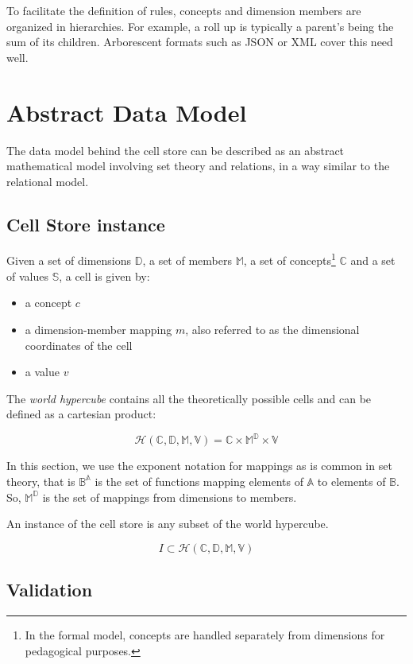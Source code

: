 \documentclass{acm_proc_article-sp}
\begin{document}
To facilitate the definition of rules, concepts and dimension members are organized in hierarchies. For example, a roll up is typically a parent's being the sum of its children. Arborescent formats such as JSON or XML cover this need well.

\section{Abstract Data Model}
\label{section-abstract-data-model}
The data model behind the cell store can be described as an abstract mathematical model involving set theory and relations, in a way similar to the relational model.
\subsection{Cell Store instance}

Given a set of dimensions $\mathbb{D}$, a set of members $\mathbb{M}$, a set of concepts\footnote{In the formal model, concepts are handled separately from dimensions for pedagogical purposes.} $\mathbb{C}$ and a set of values $\mathbb{S}$, a cell is given by:

\begin{itemize}
\item a concept $c$
\item a dimension-member mapping $m$, also referred to as the dimensional coordinates of the cell
\item a value $v$
\end{itemize}

The \emph{world hypercube} contains all the theoretically possible cells and can be defined as a cartesian product:

$$\mathcal{H}(\mathbb{C}, \mathbb{D}, \mathbb{M}, \mathbb{V})=\mathbb{C}\times\mathbb{M}^\mathbb{D}\times\mathbb{V}$$

In this section, we use the exponent notation for mappings as is common in set theory, that is $\mathbb{B}^\mathbb{A}$ is the set of functions mapping elements of $\mathbb{A}$ to elements of $\mathbb{B}$. So, $\mathbb{M}^\mathbb{D}$ is the set of mappings from dimensions to members.

An instance of the cell store is any subset of the world hypercube.

$$I\subset\mathcal{H}(\mathbb{C}, \mathbb{D}, \mathbb{M}, \mathbb{V})$$

\subsection{Validation}
\end{document}
